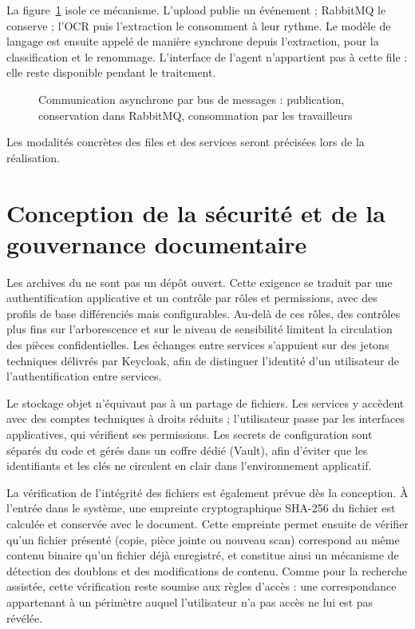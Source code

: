 La figure~\ref{fig:communication-async} isole ce mécanisme. L'upload publie un événement ; RabbitMQ le conserve ; l'OCR puis l'extraction le consomment à leur rythme. Le modèle de langage est ensuite appelé de manière synchrone depuis l'extraction, pour la classification et le renommage. L'interface de l'agent n'appartient pas à cette file : elle reste disponible pendant le traitement.

\begin{figure}[H]
\centering
\resizebox{\textwidth}{!}{}
\caption{Communication asynchrone par bus de messages : publication, conservation dans RabbitMQ, consommation par les travailleurs}
\label{fig:communication-async}
\end{figure}

Les modalités concrètes des files et des services seront précisées lors de la réalisation.

\section{Conception de la sécurité et de la gouvernance documentaire}

Les archives du \nomMinistere{} ne sont pas un dépôt ouvert. Cette exigence se traduit par une authentification applicative et un contrôle par rôles et permissions, avec des profils de base différenciés mais configurables. Au-delà de ces rôles, des contrôles plus fins sur l'arborescence et sur le niveau de sensibilité limitent la circulation des pièces confidentielles. Les échanges entre services s'appuient sur des jetons techniques délivrés par Keycloak, afin de distinguer l'identité d'un utilisateur de l'authentification entre services.

Le stockage objet n'équivaut pas à un partage de fichiers. Les services y accèdent avec des comptes techniques à droits réduits ; l'utilisateur passe par les interfaces applicatives, qui vérifient ses permissions. Les secrets de configuration sont séparés du code et gérés dans un coffre dédié (Vault), afin d'éviter que les identifiants et les clés ne circulent en clair dans l'environnement applicatif.

La vérification de l'intégrité des fichiers est également prévue dès la conception. À l'entrée dans le système, une empreinte cryptographique SHA-256 du fichier est calculée et conservée avec le document. Cette empreinte permet ensuite de vérifier qu'un fichier présenté (copie, pièce jointe ou nouveau scan) correspond au même contenu binaire qu'un fichier déjà enregistré, et constitue ainsi un mécanisme de détection des doublons et des modifications de contenu. Comme pour la recherche assistée, cette vérification reste soumise aux règles d'accès : une correspondance appartenant à un périmètre auquel l'utilisateur n'a pas accès ne lui est pas révélée.

